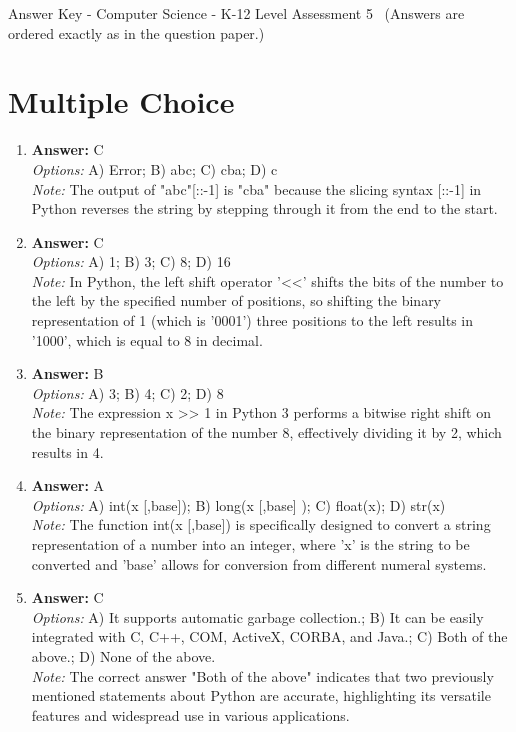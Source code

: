 \documentclass[12pt]{article}
\begin{document}
\begin{center}
Answer Key - Computer Science - K-12 Level Assessment 5 \
\small (Answers are ordered exactly as in the question paper.)
\end{center}

\section*{Multiple Choice}
\begin{enumerate}[label=\arabic*.]
\item \textbf{Answer:} C
\\ \textit{Options:} A) Error; B) abc; C) cba; D) c
\\ \textit{Note:} The output of "abc"[::-1] is "cba" because the slicing syntax [::-1] in Python reverses the string by stepping through it from the end to the start.
\item \textbf{Answer:} C
\\ \textit{Options:} A) 1; B) 3; C) 8; D) 16
\\ \textit{Note:} In Python, the left shift operator '\textless{}\textless{}' shifts the bits of the number to the left by the specified number of positions, so shifting the binary representation of 1 (which is '0001') three positions to the left results in '1000', which is equal to 8 in decimal.
\item \textbf{Answer:} B
\\ \textit{Options:} A) 3; B) 4; C) 2; D) 8
\\ \textit{Note:} The expression x \textgreater{}\textgreater{} 1 in Python 3 performs a bitwise right shift on the binary representation of the number 8, effectively dividing it by 2, which results in 4.
\item \textbf{Answer:} A
\\ \textit{Options:} A) int(x [,base]); B) long(x [,base] ); C) float(x); D) str(x)
\\ \textit{Note:} The function int(x [,base]) is specifically designed to convert a string representation of a number into an integer, where 'x' is the string to be converted and 'base' allows for conversion from different numeral systems.
\item \textbf{Answer:} C
\\ \textit{Options:} A) It supports automatic garbage collection.; B) It can be easily integrated with C, C++, COM, ActiveX, CORBA, and Java.; C) Both of the above.; D) None of the above.
\\ \textit{Note:} The correct answer "Both of the above" indicates that two previously mentioned statements about Python are accurate, highlighting its versatile features and widespread use in various applications.
\end{enumerate}
\end{document}
